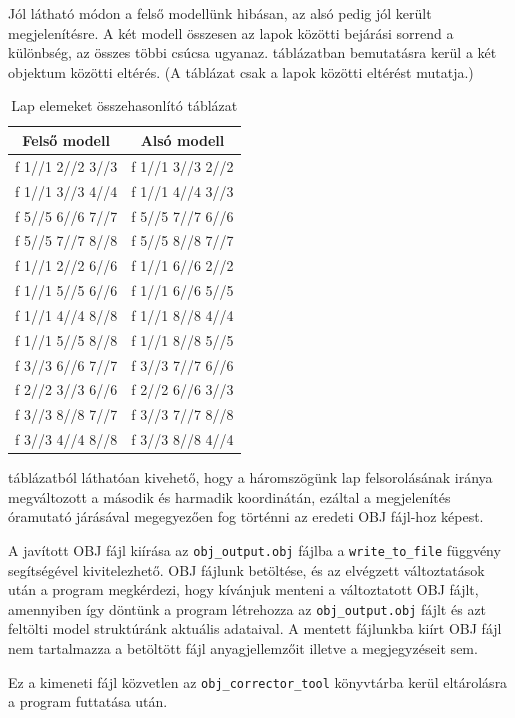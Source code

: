 Jól látható módon a felső modellünk hibásan, az alsó pedig jól került megjelenítésre. A két modell összesen az lapok közötti bejárási sorrend a különbség, az összes többi csúcsa ugyanaz.  táblázatban bemutatásra kerül a két objektum közötti eltérés. (A táblázat csak a lapok közötti eltérést mutatja.)

\begin{table}[h]
\centering
\caption{Lap elemeket összehasonlító táblázat}
\bigskip
\begin{tabular}{|c|c|}
Felső modell& Alsó modell \\
\hline
f  1//1 2//2 3//3 & f  1//1 3//3 2//2 \\
f  1//1 3//3 4//4 & f  1//1 4//4 3//3 \\
f  5//5 6//6 7//7 & f  5//5 7//7 6//6 \\
f  5//5 7//7 8//8 & f  5//5 8//8 7//7 \\ 
f  1//1 2//2 6//6 & f  1//1 6//6 2//2 \\
f  1//1 5//5 6//6 & f  1//1 6//6 5//5 \\
f  1//1 4//4 8//8 & f  1//1 8//8 4//4 \\
f  1//1 5//5 8//8 & f  1//1 8//8 5//5 \\
f  3//3 6//6 7//7 & f  3//3 7//7 6//6 \\
f  2//2 3//3 6//6 & f  2//2 6//6 3//3 \\
f  3//3 8//8 7//7 & f  3//3 7//7 8//8 \\
f  3//3 4//4 8//8 & f  3//3 8//8 4//4 \\
\hline
\end{tabular}
\label{fig:bej3}
\end{table}
\bigskip 
\newpage
{} táblázatból láthatóan kivehető, hogy a háromszögünk lap felsorolásának iránya megváltozott a második és harmadik koordinátán, ezáltal a megjelenítés óramutató járásával megegyezően fog történni az eredeti OBJ fájl-hoz képest.


A javított OBJ fájl kiírása az \texttt{obj\_output.obj} fájlba a \texttt{write\_to\_file} függvény segítségével kivitelezhető. OBJ fájlunk betöltése, és az elvégzett változtatások után a program megkérdezi, hogy kívánjuk menteni a változtatott OBJ fájlt, amennyiben így döntünk a program létrehozza az \texttt{obj\_output.obj} fájlt és azt feltölti model struktúránk aktuális adataival. A mentett fájlunkba kiírt OBJ fájl nem tartalmazza a betöltött fájl anyagjellemzőit illetve a megjegyzéseit sem.
\bigskip
{}
\bigskip

Ez a kimeneti fájl közvetlen az \texttt{obj\_corrector\_tool} könyvtárba kerül eltárolásra a program futtatása után.
